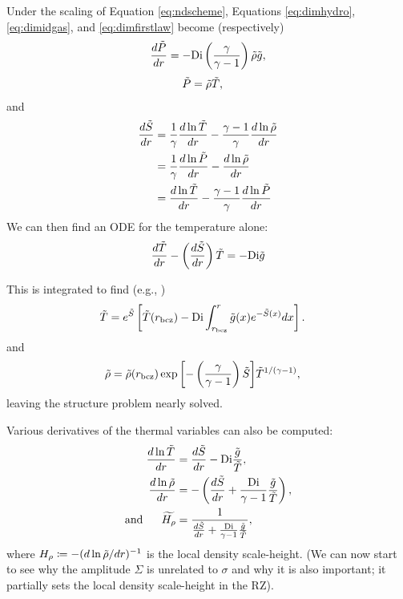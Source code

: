 \documentclass[12pt]{article}
\numberwithin{equation}{section}
\begin{document}
Under the scaling of Equation \eqref{eq:ndscheme}, Equations \eqref{eq:dimhydro}, \eqref{eq:dimidgas}, and \eqref{eq:dimfirstlaw} become (respectively)
\begin{align}\label{eq:hydro}
	\frac{d\tilde{P}}{dr}= -{\rm{Di}}\left(\frac{\gamma}{\gamma-1}\right)\tilde{\rho} \tilde{g},
\end{align}
\begin{align}
	\tilde{P} &= \tilde{\rho} \tilde{T},\label{eq:idgas}
\end{align}
and
\begin{subequations}\label{eq:firstlaw}
	\begin{align}
		\frac{d\tilde{S}}{dr}&=\frac{1}{\gamma}\frac{d\ln\tilde{T}}{dr} - \frac{\gamma - 1}{\gamma}\frac{d\ln\tilde{\rho}}{dr}\label{eq:firstlawtmprho}\\
		&=\frac{1}{\gamma}\frac{d\ln\tilde{P}}{dr} - \frac{d\ln\tilde{\rho}}{dr}\label{eq:firstlawprsrho}\\
		&= \frac{d\ln\tilde{T}}{dr} - \frac{\gamma - 1}{\gamma}\frac{d\ln\tilde{P}}{dr}\label{eq:firstlawtmpprs}
	\end{align}
\end{subequations}
We can then find an ODE for the temperature alone:
\begin{align}
	\frac{d\tilde{T}}{dr}-\left(\frac{d\tilde{S}}{dr}\right)\tilde{T} = - {\rm{Di}} \tilde{g}
\end{align}

This is integrated to find (e.g., \citealt{Matilsky2024})
\begin{align}\label{eq:tmptilde}
	\tilde{T} &= e^{\tilde{S}}\left[\tilde{T}(r_{\rm bcz}) - {\rm{Di}}\int_{r_{\rm bcz}}^r \tilde{g}(x)  e^{-\tilde{S}(x)}dx\right].
\end{align}
and
\begin{align}\label{eq:rhotilde}
	\tilde{\rho} &= \tilde{\rho}(r_{\rm bcz}) \exp{\left[-\left(\frac{\gamma}{\gamma-1}\right)\tilde{S}\right]}\tilde{T}^{1/(\gamma-1)},
\end{align}
leaving the structure problem nearly solved. 

Various derivatives of the thermal variables can also be computed:
\begin{align}
	\frac{d\ln\tilde{T}}{dr} &= \frac{d\tilde{S}}{dr} - {\rm{Di}} \frac{\tilde{g}}{\tilde{T}},\\
	\frac{d\ln\tilde{\rho}}{dr} &= -\left(\frac{d\tilde{S}}{dr} + \frac{{\rm{Di}}}{\gamma-1}\frac{\tilde{g}}{\tilde{T}}\right),\\
	\text{and}\ \ \ \ \  \widetilde{H_\rho} &=\frac{1}{\frac{d\tilde{S}}{dr} + \frac{{\rm{Di}}}{\gamma-1}\frac{\tilde{g}}{\tilde{T}}},
\end{align}
where $H_\rho\coloneqq-(d\ln\tilde{\rho}/dr)^{-1}$ is the local density scale-height. (We can now start to see why the amplitude $\Sigma$ is unrelated to $\sigma$ and why it is also important; it partially sets the local density scale-height in the RZ). 
\end{document}
